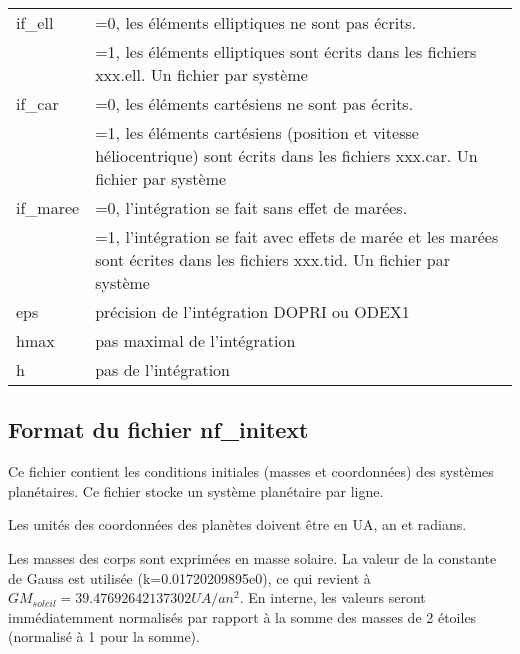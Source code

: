 \documentclass[11pt]{article}
\begin{document}
\begin{tabularx}{\textwidth}{|l|X|}
 if\_ell & =0, les \'el\'ements elliptiques ne sont pas \'ecrits.\\
&=1, les \'el\'ements elliptiques sont \'ecrits dans les fichiers xxx.ell. Un fichier par syst\`eme\\ \hline
 
 if\_car &  =0, les \'el\'ements cart\'esiens ne sont pas \'ecrits.\\
&=1, les \'el\'ements cart\'esiens (position et vitesse h\'eliocentrique) sont \'ecrits dans les fichiers xxx.car. Un fichier par syst\`eme\\
\hline
if\_maree & =0, l'int\'egration se fait sans effet de mar\'ees. \\
   &=1, l'int\'egration se fait avec effets de mar\'ee et les mar\'ees sont
   \'ecrites dans les fichiers xxx.tid. Un fichier par syst\`eme \\ \hline
eps  & pr\'ecision de l'int\'egration DOPRI ou ODEX1\\ \hline
hmax & pas maximal de l'int\'egration \\ \hline
h    & pas de l'int\'egration \\ \hline
 \end{tabularx}



\subsection{Format du fichier nf\_initext}

Ce fichier contient les conditions initiales (masses et coordonn\'ees) des syst\`emes plan\'etaires. 
Ce fichier stocke un syst\`eme plan\'etaire par ligne.

Les unit\'es des coordonn\'ees des plan\`etes doivent \^etre en UA, an et radians.

Les masses des corps sont exprimées en masse solaire.   La valeur de la constante de Gauss est utilisée (k=0.01720209895e0), ce qui revient à $GM_{soleil}=39.47692642137302 UA/an^2$.  En interne, les valeurs seront imm\'ediatemment normalis\'es par rapport \`a la somme des masses de 2 \'etoiles (normalis\'e \`a 1 pour la somme).
\end{document}
